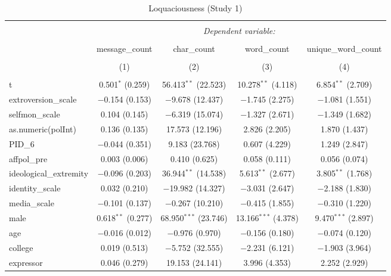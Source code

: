 
\begin{table}[H] \centering 
  \caption{Loquaciousness (Study 1)} 
  \label{tab:s1_loquaciousness} 
\begin{tabular}{@{\extracolsep{5pt}}lcccc} 
\\[-1.8ex]\hline 
\hline \\[-1.8ex] 
 & \multicolumn{4}{c}{\textit{Dependent variable:}} \\ 
\cline{2-5} 
\\[-1.8ex] & message\_count & char\_count & word\_count & unique\_word\_count \\ 
\\[-1.8ex] & (1) & (2) & (3) & (4)\\ 
\hline \\[-1.8ex] 
 t & 0.501$^{*}$ (0.259) & 56.413$^{**}$ (22.523) & 10.278$^{**}$ (4.118) & 6.854$^{**}$ (2.709) \\ 
  extroversion\_scale & $-$0.154 (0.153) & $-$9.678 (12.437) & $-$1.745 (2.275) & $-$1.081 (1.551) \\ 
  selfmon\_scale & 0.104 (0.145) & $-$6.319 (15.074) & $-$1.327 (2.671) & $-$1.349 (1.682) \\ 
  as.numeric(polInt) & 0.136 (0.135) & 17.573 (12.196) & 2.826 (2.205) & 1.870 (1.437) \\ 
  PID\_6 & $-$0.044 (0.351) & 9.183 (23.768) & 0.607 (4.229) & 1.249 (2.847) \\ 
  affpol\_pre & 0.003 (0.006) & 0.410 (0.625) & 0.058 (0.111) & 0.056 (0.074) \\ 
  ideological\_extremity & $-$0.096 (0.203) & 36.944$^{**}$ (14.538) & 5.613$^{**}$ (2.677) & 3.805$^{**}$ (1.768) \\ 
  identity\_scale & 0.032 (0.210) & $-$19.982 (14.327) & $-$3.031 (2.647) & $-$2.188 (1.830) \\ 
  media\_scale & $-$0.101 (0.137) & $-$0.267 (10.210) & $-$0.415 (1.855) & $-$0.310 (1.220) \\ 
  male & 0.618$^{**}$ (0.277) & 68.950$^{***}$ (23.746) & 13.166$^{***}$ (4.378) & 9.470$^{***}$ (2.897) \\ 
  age & $-$0.016 (0.012) & $-$0.976 (0.970) & $-$0.156 (0.180) & $-$0.074 (0.120) \\ 
  college & 0.019 (0.513) & $-$5.752 (32.555) & $-$2.231 (6.121) & $-$1.903 (3.964) \\ 
  expressor & 0.046 (0.279) & 19.153 (24.141) & 3.996 (4.353) & 2.252 (2.929) \\ 

\end{tabular}
\end{table}
